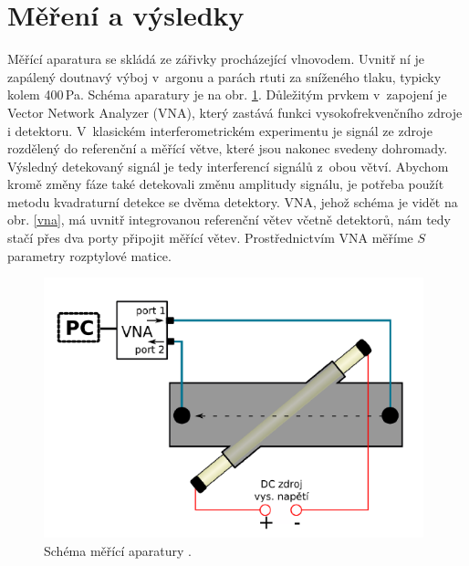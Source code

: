 \documentclass[a4paper,12pt]{article}
\begin{document}

\section{Měření a výsledky}
Měřící aparatura se skládá ze zářivky procházející vlnovodem. Uvnitř ní je
zapálený doutnavý výboj v~argonu a parách rtuti 
za sníženého tlaku, typicky kolem 400\,\si{\pascal}. Schéma aparatury je na obr.
\ref{schema}. Důležitým prvkem v~zapojení je Vector Network Analyzer (VNA),
který zastává funkci vysokofrekvenčního zdroje i detektoru.
V~klasickém interferometrickém experimentu je signál ze zdroje rozdělený do
referenční a měřící větve, které jsou nakonec svedeny dohromady. Výsledný 
detekovaný signál je tedy interferencí signálů z~obou větví. Abychom kromě 
změny fáze také detekovali změnu amplitudy signálu, je potřeba použít metodu 
kvadraturní detekce se dvěma detektory. VNA, jehož schéma je vidět na 
obr. \ref{vna}, má uvnitř integrovanou referenční větev včetně detektorů, 
nám tedy stačí přes dva porty připojit měřící větev. Prostřednictvím VNA měříme $S$ parametry rozptylové matice.

\begin{figure}[h]
	\centering
	\includegraphics[width=110mm]{schema.png}
	\caption{Schéma měřící aparatury \cite{navod}.}
	\label{schema}
\end{figure}
\end{document}
